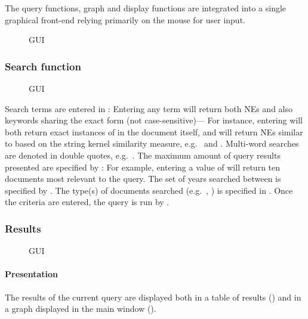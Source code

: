 The query functions, graph and display functions are integrated into a single graphical front-end relying primarily on the mouse for user input.

\begin{figure}[h]
\centering
\caption{GUI}
\end{figure}

\subsubsection{Search function}
\begin{figure}[h]
\centering
\caption{GUI}
\end{figure}

Search terms are entered in : Entering any term will return both NEs and also keywords sharing the exact form (not case-sensitive)--- For instance, entering  will both return exact instances of  in the document itself, and will return NEs similar to  based on the string kernel similarity measure, e.g.\  and . Multi-word searches are denoted in double quotes, e.g.\ . The maximum amount of query results presented are specified by : For example, entering a value of  will return ten documents most relevant to the query. The set of years searched between is specified by . The type(s) of documents searched (e.g.\ , ) is specified in . Once the criteria are entered, the query is run by .

\subsubsection{Results}
\begin{figure}[h]
\centering
\caption{GUI}
\end{figure}

\paragraph{Presentation}
The results of the current query are displayed both in a table of results () and in a graph displayed in the main window ().

